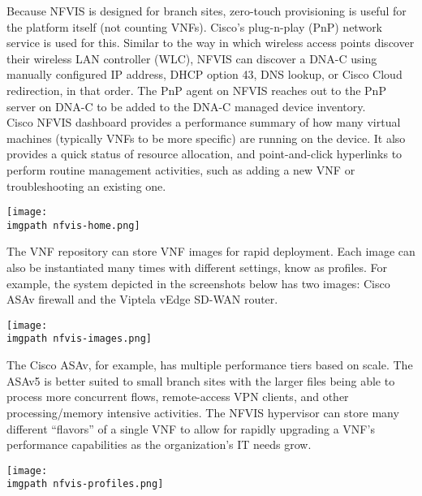 Because NFVIS is designed for branch sites, zero-touch provisioning is useful
for the platform itself (not counting VNFs). Cisco's plug-n-play (PnP) network
service is used for this. Similar to the way in which wireless access points
discover their wireless LAN controller (WLC), NFVIS can discover a DNA-C using
manually configured IP address, DHCP option 43, DNS lookup, or Cisco Cloud
redirection, in that order. The PnP agent on NFVIS reaches out to the PnP
server on DNA-C to be added to the DNA-C managed device inventory. \\

Cisco NFVIS dashboard provides a performance summary of how many virtual machines
(typically VNFs to be more specific) are running on the device. It also
provides a quick status of resource allocation, and point-and-click hyperlinks
to perform routine management activities, such as adding a new VNF or
troubleshooting an existing one.

    \begin{minipage}[t]{\linewidth}
	  \centering
      \texttt{[image: \\imgpath nfvis-home.png]}
    \end{minipage}

The VNF repository can store VNF images for rapid deployment. Each image can
also be instantiated many times with different settings, know as profiles. For
example, the system depicted in the screenshots below has two images: Cisco
ASAv firewall and the Viptela vEdge SD-WAN router.

    \begin{minipage}[t]{\linewidth}
	  \centering
      \texttt{[image: \\imgpath nfvis-images.png]}
    \end{minipage}

The Cisco ASAv, for example, has multiple performance tiers based on scale.
The ASAv5 is better suited to small branch sites with the larger files being
able to process more concurrent flows, remote-access VPN clients, and other
processing/memory intensive activities. The NFVIS hypervisor can store many
different ``flavors'' of a single VNF to allow for rapidly upgrading a VNF's
performance capabilities as the organization's IT needs grow.

    \begin{minipage}[t]{\linewidth}
	  \centering
      \texttt{[image: \\imgpath nfvis-profiles.png]}
    \end{minipage}

